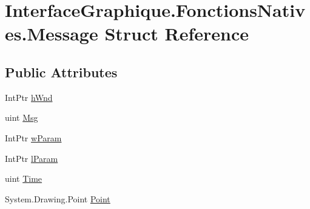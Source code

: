 \hypertarget{struct_interface_graphique_1_1_fonctions_natives_1_1_message}{\section{Interface\-Graphique.\-Fonctions\-Natives.\-Message Struct Reference}
\label{struct_interface_graphique_1_1_fonctions_natives_1_1_message}
}
\subsection*{Public Attributes}
\begin{DoxyCompactItemize}
\item 
Int\-Ptr \hyperlink{struct_interface_graphique_1_1_fonctions_natives_1_1_message_aa25d996ad709246eecada71a0f375b21}{h\-Wnd}
\item 
uint \hyperlink{struct_interface_graphique_1_1_fonctions_natives_1_1_message_a1b1dfd72e58f292bbd24d6dc7a0b0f61}{Msg}
\item 
Int\-Ptr \hyperlink{struct_interface_graphique_1_1_fonctions_natives_1_1_message_aa04705defc08a7fea09f90b1cd069e20}{w\-Param}
\item 
Int\-Ptr \hyperlink{struct_interface_graphique_1_1_fonctions_natives_1_1_message_afc019b6c13559ba2a12a64e24eba9baf}{l\-Param}
\item 
uint \hyperlink{struct_interface_graphique_1_1_fonctions_natives_1_1_message_ae0ab10151482b01c9c5fe1cb4e8a2306}{Time}
\item 
System.\-Drawing.\-Point \hyperlink{struct_interface_graphique_1_1_fonctions_natives_1_1_message_a9dc93f6c7f6db4f91386aef27b0a77ad}{Point}
\end{DoxyCompactItemize}


